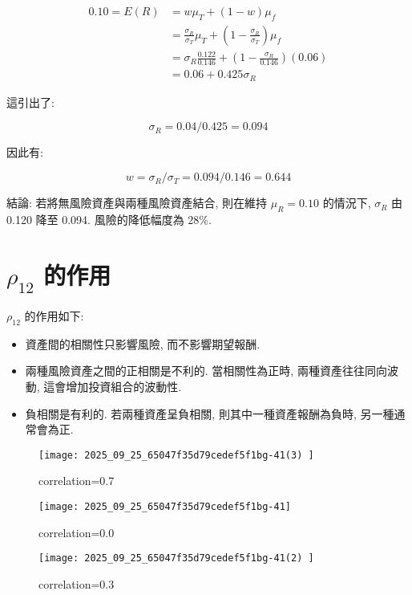 \documentclass[letterpaper]{article}
\begin{document}
		$$
		\begin{aligned}
			0.10=E (R) & =w \mu_{T}+ (1-w) \mu_{f} \\
			& =\frac{\sigma_{R}}{\sigma_{T}} \mu_{T}+\left (1-\frac{\sigma_{R}}{\sigma_{T}}\right) \mu_{f} \\
			& =\sigma_{R} \frac{0.122}{0.146}+\left (1-\frac{\sigma_{R}}{0.146}\right) (0.06) \\
			& =0.06+0.425 \sigma_{R}
		\end{aligned}
		$$
		
		這引出了: 
		
		$$
		\sigma_{R}=0.04 / 0.425=0.094
		$$
		
		因此有: 
		
		$$
		w=\sigma_{R} / \sigma_{T}=0.094 / 0.146=0.644
		$$
		
		結論: 若將無風險資產與兩種風險資產結合, 則在維持 $\mu_{R}=0.10$ 的情況下, $\sigma_{R}$ 由 0.120 降至 0.094. 風險的降低幅度為 $28\%$. 
		
		
		\section{ $\rho_{12}$ 的作用}
		$\rho_{12}$ 的作用如下: 
		
		\begin{itemize}
			\item 資產間的相關性只影響風險, 而不影響期望報酬. 
			\item 兩種風險資產之間的正相關是不利的. 當相關性為正時, 兩種資產往往同向波動, 這會增加投資組合的波動性. 
			\item 負相關是有利的. 若兩種資產呈負相關, 則其中一種資產報酬為負時, 另一種通常會為正. 
		\end{itemize}
		
		\begin{figure}[h]
			\begin{center}
				\caption{correlation=0.7}
				\texttt{[image: 2025\_09\_25\_65047f35d79cedef5f1bg-41(3) ]}
			\end{center}
		\end{figure}
		
		\begin{figure}[h]
			\begin{center}
				\caption{correlation=0.0}
				\texttt{[image: 2025\_09\_25\_65047f35d79cedef5f1bg-41]}
			\end{center}
		\end{figure}
		
		\begin{figure}[h]
			\begin{center}
				\caption{correlation=0.3}
				\texttt{[image: 2025\_09\_25\_65047f35d79cedef5f1bg-41(2) ]}
			\end{center}
		\end{figure}
		
\end{document}
